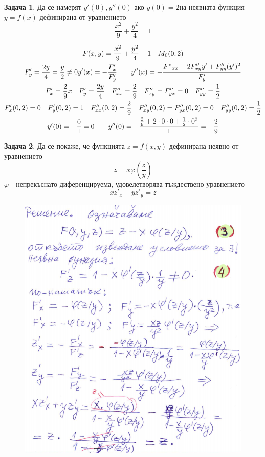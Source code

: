 \documentclass[a4paper,fleqn,12pt]{article}
\theoremstyle{definition}
\newtheorem{task}{Задача}[subsection]
\begin{document}
\newpage
\begin{task}
Да се намерят $y'(0), y''(0)$ ако $y(0) = 2$на неявната функция $y = f(x)$ дефинирана от уравнението 
$$\frac{x^2}{9} + \frac{y^2}{4} = 1$$

\begin{gather*}
F(x,y) = \frac{x^2}{9} + \frac{y^2}{4} - 1 \quad M_0(0,2)\\
F'_y = \frac{2y}{4} = \frac{y}{2} \neq 0 
y'(x) = - \frac{F'_x}{F'_y} \qquad y''(x) = - \frac{F"_{xx} + 2F''_{xy}y' + F''_{yy}(y')^2}{F'_y}\\
F'_x = \frac{2}{9} x \quad F'_y = \frac{2y}{4} \quad F''_{xx} = \frac{2}{9} \quad F''_{xy} = F''_{yx} = 0 \quad F''_{yy} = \frac{1}{2} \\
F'_x(0,2) = 0 \quad F'_y(0,2) = 1 \quad F''_{xx}(0,2) = \frac{2}{9} \quad F''_{xy}(0,2) = F''_{yx}(0,2) = 0 \quad F''_{yy}(0,2) = \frac{1}{2} \\
y'(0) = - \frac{0}{1} = 0 \qquad y''(0) = - \frac{\frac{2}{9} + 2 \cdot 0 \cdot 0 + \frac{1}{2} \cdot 0^2}{1} = - \frac{2}{9}\\
\end{gather*}
\end{task}

\begin{task}
Да се покаже, че функцията $z = f(x,y)$ дефинирана неявно от уравнението 
$$z = x \varphi (\frac{z}{y})$$
$\varphi $ - непрекъснато диференцируема, удовелетворява тъждествено уравнението
$$xz'_x + yz'_y = z$$
\begin{figure}
  \includegraphics{Pics/calc/ex7-task4.png}
\end{figure}
\end{task}
\end{document}
